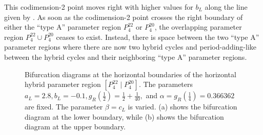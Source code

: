 This codimension-2 point moves right with higher values for $b_L$ along the line given by .
As soon as the codimension-2 point crosses the right boundary of either the ``type A'' parameter region $P^{22}_4$ or $P^{20}_4$, the overlapping parameter region $P^{22}_4 \cup P^{20}_4$ ceases to exist.
Instead, there is space between the two ``type A'' parameter regions where there are now two hybrid cycles and period-adding-like between the hybrid cycles and their neighboring ``type A'' parameter regions.

\begin{figure}
	\centering
	\caption[Bifurcation diagrams for the horizontal hybrid parameter regions in the increasing archetypal model]{
		Bifurcation diagrams at the horizontal boundaries of the horizontal hybrid parameter region $\left[P^{22}_4 \mid P^{20}_4\right]$.
		The parameters $a_L = 2.8, b_L = -0.1, g_R\left(\frac{1}{2}\right) = \frac{1}{2} + \frac{1}{40},$ and $\alpha = g_R\left(\frac{1}{4}\right) = 0.366362$ are fixed.
		The parameter $\beta = c_L$ is varied.
		(a) shows the bifurcation diagram at the lower boundary, while (b) shows the bifurcation diagram at the upper boundary.
	}
	\label{fig:add.change.appa.hor.bif}
\end{figure}

